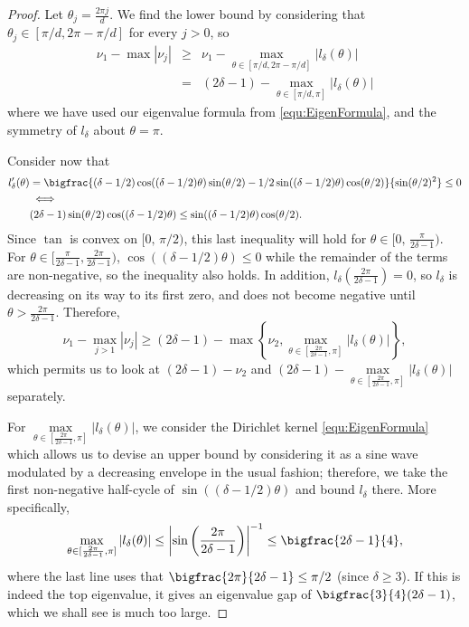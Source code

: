 \begin{proof}

Let $\theta_j = \frac{2 \pi j}{d}$.  We find the lower bound by considering that $\theta_j \in [\pi / d, 2\pi - \pi / d]$ for every $j > 0$, so 
\begin{eqnarray*}
  \nu_1 - \max | \nu_j |& \ge & \nu_1 - \max_{\theta \in [\pi / d, 2\pi - \pi / d]} | l_\delta(\theta) | \\
  & = & (2 \delta - 1) - \max_{\theta \in [\pi / d, \pi]} | l_\delta(\theta) |
\end{eqnarray*}
where we have used our eigenvalue formula from \eqref{equ:EigenFormula}, and the symmetry of $l_\delta$ about $\theta = \pi$.

Consider now that 
\begin{align*}
  l_\delta'(\theta)  &=  \bigfrac{(\delta - 1/2)\cos((\delta - 1/2)\theta) \sin(\theta/2) - 1/2 \sin((\delta - 1/2)\theta) \cos(\theta / 2)}{\sin(\theta / 2) ^ 2} 
   \le  0\\ 
  & \iff  \\
  &(2\delta - 1) \sin(\theta/2)\cos((\delta - 1/2)\theta)  \le  \sin((\delta - 1/2)\theta) \cos(\theta /2 ). 
\end{align*}
Since $\tan$ is convex on $[0,\, \pi / 2)$, this last inequality will hold for $\theta \in [0,\, \frac{\pi}{2\delta - 1})$.  For $\theta \in [\frac{\pi}{2\delta-1}, \frac{2\pi}{2\delta -1})$, $\cos((\delta - 1/2)\theta) \leq 0$ while the remainder of the terms are non-negative, so the inequality also holds.  In addition, $l_\delta(\frac{2\pi}{2\delta - 1}) = 0$, so $l_\delta$ is decreasing on its way to its first zero, and does not become negative until $\theta > \frac{2\pi}{2\delta - 1}$.  Therefore,
\[\nu_1 - \max_{j > 1} |\nu_j| \ge (2 \delta - 1) - \max \left\{\nu_2, \max_{\theta \in [\frac{2\pi}{2\delta-1}, \pi]} |l_\delta(\theta)| \right\},\]
which permits us to look at $(2 \delta - 1) - \nu_2$ and $(2 \delta - 1) - \max\limits_{\theta \in [\frac{2\pi}{2\delta-1}, \pi]} |l_\delta(\theta)|$ separately.

For $\max\limits_{\theta \in [\frac{2\pi}{2\delta-1}, \pi]} |l_\delta(\theta)|$, we consider the Dirichlet kernel \eqref{equ:EigenFormula} %
which allows us to devise an upper bound by considering it as a sine wave modulated by a decreasing envelope in the usual fashion; therefore, we take the first non-negative half-cycle of $\sin((\delta - 1/2)\theta)$ and bound $l_\delta$ there.  More specifically,
$$  \max_{\theta \in [\frac{2\pi}{2\delta-1}, \pi]} | l_\delta(\theta) |  \le \left| \sin \left(\frac{2\pi}{2\delta - 1} \right) \right|^{-1}  \le \bigfrac{2\delta - 1}{4},$$
where the last line uses that $\bigfrac{2 \pi}{2\delta - 1} \le \pi / 2$ (since $\delta \ge 3$).  If this is indeed the top eigenvalue, it gives an eigenvalue gap of $\bigfrac{3}{4}(2\delta - 1)$, which we shall see is much too large.


\end{proof}
